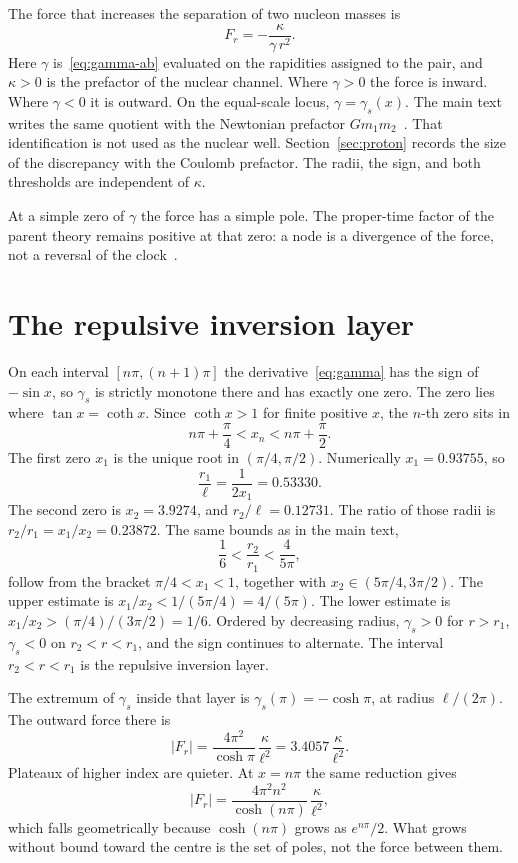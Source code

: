 \documentclass[a4paper]{article}
\begin{document}
The force that increases the separation of two nucleon masses is
\begin{equation}
\label{eq:force}
F_r=-\frac{\kappa}{\gamma\,r^{2}}.
\end{equation}
Here \(\gamma\) is~\eqref{eq:gamma-ab} evaluated on the rapidities assigned to the pair, and \(\kappa>0\) is the prefactor of the nuclear channel. Where \(\gamma>0\) the force is inward. Where \(\gamma<0\) it is outward. On the equal-scale locus, \(\gamma=\gamma_s(x)\). The main text writes the same quotient with the Newtonian prefactor \(G m_1 m_2\)~\cite{dst-main}. That identification is not used as the nuclear well. Section~\ref{sec:proton} records the size of the discrepancy with the Coulomb prefactor. The radii, the sign, and both thresholds are independent of \(\kappa\).

At a simple zero of \(\gamma\) the force has a simple pole. The proper-time factor of the parent theory remains positive at that zero: a node is a divergence of the force, not a reversal of the clock~\cite{dst-main}.

\section{The repulsive inversion layer}
\label{sec:layer}

On each interval \([n\pi,(n+1)\pi]\) the derivative~\eqref{eq:gamma} has the sign of \(-\sin x\), so \(\gamma_s\) is strictly monotone there and has exactly one zero. The zero lies where \(\tan x=\coth x\). Since \(\coth x>1\) for finite positive \(x\), the \(n\)-th zero sits in
\[
n\pi+\frac{\pi}{4}<x_n<n\pi+\frac{\pi}{2}.
\]
The first zero \(x_1\) is the unique root in \((\pi/4,\pi/2)\). Numerically \(x_1=0.93755\), so
\[
\frac{r_1}{\ell}=\frac{1}{2x_1}=0.53330.
\]
The second zero is \(x_2=3.9274\), and \(r_2/\ell=0.12731\). The ratio of those radii is \(r_2/r_1=x_1/x_2=0.23872\). The same bounds as in the main text,
\[
\frac16<\frac{r_2}{r_1}<\frac{4}{5\pi},
\]
follow from the bracket \(\pi/4<x_1<1\), together with \(x_2\in(5\pi/4,3\pi/2)\). The upper estimate is \(x_1/x_2<1/(5\pi/4)=4/(5\pi)\). The lower estimate is \(x_1/x_2>(\pi/4)/(3\pi/2)=1/6\). Ordered by decreasing radius, \(\gamma_s>0\) for \(r>r_1\), \(\gamma_s<0\) on \(r_2<r<r_1\), and the sign continues to alternate. The interval \(r_2<r<r_1\) is the repulsive inversion layer.

The extremum of \(\gamma_s\) inside that layer is \(\gamma_s(\pi)=-\cosh\pi\), at radius \(\ell/(2\pi)\). The outward force there is
\begin{equation}
\label{eq:plateau}
|F_r|
  =\frac{4\pi^{2}}{\cosh\pi}\,\frac{\kappa}{\ell^{2}}
  =3.4057\,\frac{\kappa}{\ell^{2}}.
\end{equation}
Plateaux of higher index are quieter. At \(x=n\pi\) the same reduction gives
\[
|F_r|=\frac{4\pi^{2} n^{2}}{\cosh(n\pi)}\,\frac{\kappa}{\ell^{2}},
\]
which falls geometrically because \(\cosh(n\pi)\) grows as \(e^{n\pi}/2\). What grows without bound toward the centre is the set of poles, not the force between them.
\end{document}
